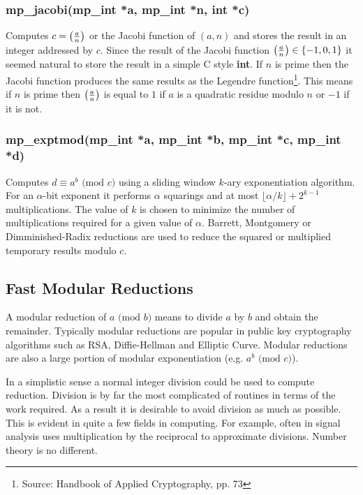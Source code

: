 \documentclass[]{article}
\begin{document}
\subsubsection{mp\_jacobi(mp\_int *a, mp\_int *n, int *c)}
Computes $c = \left ( {a \over n} \right )$ or the Jacobi function of $(a, n)$ and stores the result in an integer addressed
by $c$.  Since the result of the Jacobi function $\left ( {a \over n} \right ) \in \lbrace -1, 0, 1 \rbrace$ it seemed
natural to store the result in a simple C style \textbf{int}.  If $n$ is prime then the Jacobi function produces
the same results as the Legendre function\footnote{Source: Handbook of Applied Cryptography, pp. 73}.  This means if
$n$ is prime then $\left ( {a \over n} \right )$ is equal to $1$ if $a$ is a quadratic residue modulo $n$ or $-1$ if 
it is not.

\subsubsection{mp\_exptmod(mp\_int *a, mp\_int *b, mp\_int *c, mp\_int *d)}
Computes $d \equiv a^b \mbox{ (mod }c\mbox{)}$ using a sliding window $k$-ary exponentiation algorithm.  For an $\alpha$-bit
exponent it performs $\alpha$ squarings and at most $\lfloor \alpha/k \rfloor + 2^{k-1}$ multiplications.  The value of $k$ is
chosen to minimize the number of multiplications required for a given value of $\alpha$.  Barrett, Montgomery or
Dimminished-Radix reductions are used to reduce the squared or multiplied temporary results modulo $c$.

\subsection{Fast Modular Reductions}

A modular reduction of $a \mbox{ (mod }b\mbox{)}$ means to divide $a$ by $b$ and obtain the remainder.  
Typically modular reductions are popular in public key cryptography algorithms such as RSA, 
Diffie-Hellman and Elliptic Curve.  Modular reductions are also a large portion of modular exponentiation 
(e.g. $a^b \mbox{ (mod }c\mbox{)}$).  

In a simplistic sense a normal integer division could be used to compute reduction.  Division is by far
the most complicated of routines in terms of the work required.  As a result it is desirable to avoid
division as much as possible.  This is evident in quite a few fields in computing.  For example, often in
signal analysis uses multiplication by the reciprocal to approximate divisions.  Number theory is no
different.
\end{document}
